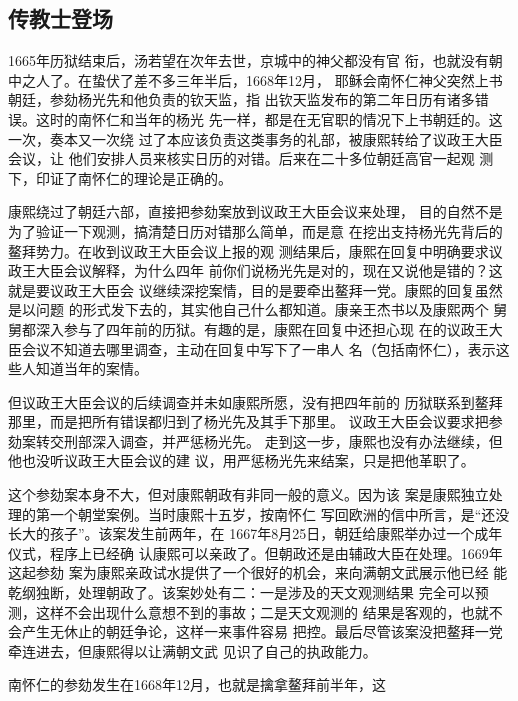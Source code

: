 \subsection{传教士登场}
\par
1665年历狱结束后，汤若望在次年去世，京城中的神父都没有官%
衔，也就没有朝中之人了。在蛰伏了差不多三年半后，1668年12月，%
耶稣会南怀仁神父突然上书朝廷，参劾杨光先和他负责的钦天监，指%
出钦天监发布的第二年日历有诸多错误。这时的南怀仁和当年的杨光%
先一样，都是在无官职的情况下上书朝廷的。这一次，奏本又一次绕%
过了本应该负责这类事务的礼部，被康熙转给了议政王大臣会议，让%
他们安排人员来核实日历的对错。后来在二十多位朝廷高官一起观%
测下，印证了南怀仁的理论是正确的。%
\par
康熙绕过了朝廷六部，直接把参劾案放到议政王大臣会议来处理，%
目的自然不是为了验证一下观测，搞清楚日历对错那么简单，而是意%
在挖出支持杨光先背后的鳌拜势力。在收到议政王大臣会议上报的观%
测结果后，康熙在回复中明确要求议政王大臣会议解释，为什么四年%
前你们说杨光先是对的，现在又说他是错的？这就是要议政王大臣会%
议继续深挖案情，目的是要牵出鳌拜一党。康熙的回复虽然是以问题%
的形式发下去的，其实他自己什么都知道。康亲王杰书以及康熙两个%
舅舅都深入参与了四年前的历狱。有趣的是，康熙在回复中还担心现%
在的议政王大臣会议不知道去哪里调查，主动在回复中写下了一串人%
名（包括南怀仁），表示这些人知道当年的案情。%
\par
但议政王大臣会议的后续调查并未如康熙所愿，没有把四年前的%
历狱联系到鳌拜那里，而是把所有错误都归到了杨光先及其手下那里。%
议政王大臣会议要求把参劾案转交刑部深入调查，并严惩杨光先。%
走到这一步，康熙也没有办法继续，但他也没听议政王大臣会议的建%
议，用严惩杨光先来结案，只是把他革职了。%
\par
这个参劾案本身不大，但对康熙朝政有非同一般的意义。因为该%
案是康熙独立处理的第一个朝堂案例。当时康熙十五岁，按南怀仁%
写回欧洲的信中所言，是“还没长大的孩子”。该案发生前两年，在%
1667年8月25日，朝廷给康熙举办过一个成年仪式，程序上已经确%
认康熙可以亲政了。但朝政还是由辅政大臣在处理。1669年这起参劾%
案为康熙亲政试水提供了一个很好的机会，来向满朝文武展示他已经%
能乾纲独断，处理朝政了。该案妙处有二：一是涉及的天文观测结果%
完全可以预测，这样不会出现什么意想不到的事故；二是天文观测的%
结果是客观的，也就不会产生无休止的朝廷争论，这样一来事件容易%
把控。最后尽管该案没把鳌拜一党牵连进去，但康熙得以让满朝文武%
见识了自己的执政能力。%
\par
南怀仁的参劾发生在1668年12月，也就是擒拿鳌拜前半年，这%
